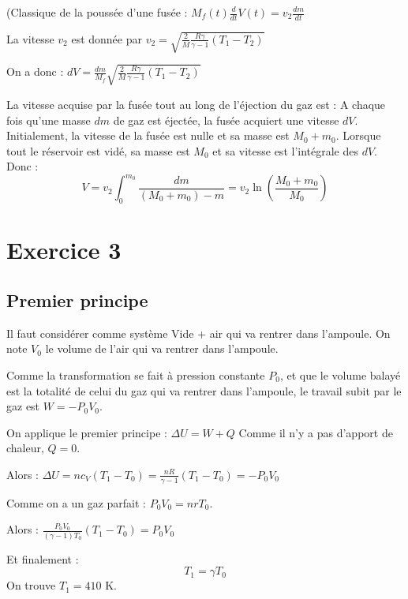 \documentclass{report}
\begin{document}
(Classique de la poussée d'une fusée : $M_f(t)\frac{d}{dt}V(t)=v_2\frac{dm}{dt}$

La vitesse $v_2$ est donnée par $v_2=\sqrt{\frac{2}{M}\frac{R\gamma}{\gamma-1}(T_1-T_2)}$

On a donc : $dV=\frac{dm}{M_f}\sqrt{\frac{2}{M}\frac{R\gamma}{\gamma-1}(T_1-T_2)}$


La vitesse acquise par la fusée tout au long de l'éjection du gaz est :
A chaque fois qu'une masse $dm$ de gaz est éjectée, la fusée acquiert une vitesse $dV$. Initialement, la vitesse de la fusée est nulle et sa masse est $M_0+m_0$. Lorsque tout le réservoir est vidé, sa masse est $M_0$ et sa vitesse est l'intégrale des $dV$. Donc :
\begin{equation}
	V=v_2\int_0^{m_0}\frac{dm}{(M_0+m_0)-m}=v_2\ln\left(\frac{M_0+m_0}{M_0} \right) 
\end{equation}

\noindent{}

\section*{Exercice 3}

\subsection*{Premier principe}

Il faut considérer comme système {Vide + air qui va rentrer dans l'ampoule}. On note $V_0$ le volume de l'air qui va rentrer dans l'ampoule.

Comme la transformation se fait à pression constante $P_0$, et que le volume balayé est la totalité de celui du gaz qui va rentrer dans l'ampoule, le travail subit par le gaz est $W = - P_0V_0$.

On applique le premier principe : $\Delta U = W + Q$
Comme il n'y a pas d'apport de chaleur, $Q=0$. 

Alors : 
$\Delta U = nc_V(T_1-T_0)=\frac{nR}{\gamma-1}(T_1-T_0) = -P_0V_0$

Comme on a un gaz parfait : $P_0V_0=nrT_0$. 

Alors : $\frac{P_0V_0}{(\gamma-1)T_0}(T_1-T_0)=P_0V_0$

Et finalement :
\begin{equation}
T_1=\gamma T_0
\end{equation}
On trouve $T_1=410$ K.
\end{document}
